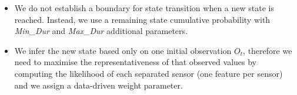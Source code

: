 \documentclass[conference]{IEEEtran}
\begin{document}
\begin{itemize}
	\item We do not establish a boundary for state transition when a new state is reached. Instead, we use a remaining state cumulative probability with \textit{Min\_Dur} and \textit{Max\_Dur} additional parameters.
	\item We infer the new state based only on one initial observation $O_t$, therefore we need to maximise the representativeness of that observed values by computing the likelihood of each separated sensor (one feature per sensor) and we assign a data-driven weight parameter. 
\end{itemize}

%
\end{document}
